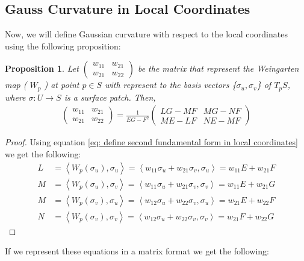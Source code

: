 \documentclass{article}
\theoremstyle{plain}
\newtheorem{proposition}{Proposition}
\theoremstyle{definition}
\theoremstyle{remark}
\begin{document}
\subsection{Gauss Curvature in Local Coordinates}
Now, we will define Gaussian curvature with respect to the local coordinates using the following proposition:
\begin{proposition}
    Let \( \begin{pmatrix}
        w_{11} & w_{21} \\
        w_{21} & w_{22} 
    \end{pmatrix}\)
    be the matrix that represent the Weingarten map ( \(W_p\) ) at point \( p \in S\) with represent to the basis vectors \{\( \sigma_u, \sigma_v \)\} of \( T_pS \), where \( \sigma: U \rightarrow S\) is a surface patch. Then, 
    \begin{align} \label{eq: Weingarten map local coordinates}
        \begin{pmatrix}
            w_{11} & w_{21} \\
            w_{21} & w_{22} 
        \end{pmatrix} = \frac{1}{EG-F^2} \begin{pmatrix}
            LG - MF & MG - NF \\
            ME - LF & NE- MF
        \end{pmatrix}
    \end{align}
\end{proposition}
\begin{proof}
    Using equation \ref{eq: define second fundamental form in local coordinates} we get the following:
    \begin{align*}
        L & = \left\langle W_p(\sigma_u), \sigma_u \right\rangle = \left\langle w_{11}\sigma_u + w_{21}\sigma_v, \sigma_u\right\rangle = w_{11}E + w_{21}F \\
        M & = \left\langle W_p(\sigma_u), \sigma_v \right\rangle =  \left\langle w_{11}\sigma_u + w_{21}\sigma_v, \sigma_v\right\rangle = w_{11}E + w_{21}G  \\
        M & = \left\langle W_p(\sigma_v), \sigma_u \right\rangle = \left\langle w_{12}\sigma_u + w_{22}\sigma_v, \sigma_u\right\rangle = w_{21}E + w_{22}F  \\
        N & = \left\langle W_p(\sigma_v), \sigma_v \right\rangle = \left\langle w_{12}\sigma_u + w_{22}\sigma_v, \sigma_v\right\rangle = w_{21}F + w_{22}G  
    \end{align*}
\end{proof}
If we represent these equations in a matrix format we get the following: 
\end{document}
